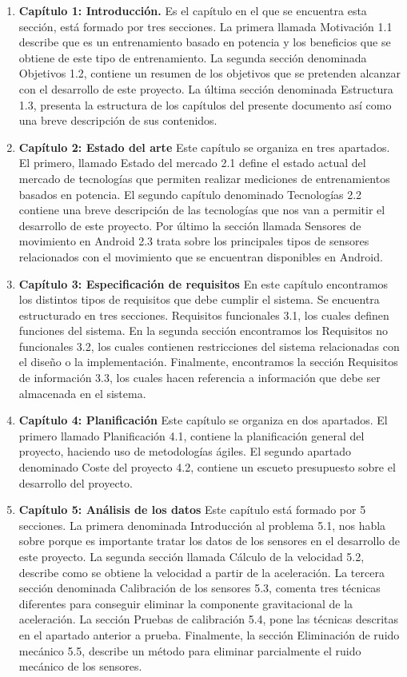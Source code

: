 \begin{enumerate}
	\item \textbf{Capítulo 1: Introducción.} Es el capítulo en el que se encuentra esta sección, está formado por tres secciones. La primera llamada Motivación 1.1 describe que es un entrenamiento basado en potencia y los beneficios que se obtiene de este tipo de entrenamiento. La segunda sección denominada Objetivos 1.2, contiene un resumen de los objetivos que se pretenden alcanzar con el desarrollo de este proyecto. La última sección denominada Estructura 1.3, presenta la estructura de los capítulos del presente documento así como una breve descripción de sus contenidos.
	\item \textbf{Capítulo 2: Estado del arte} Este capítulo se organiza en tres apartados. El primero, llamado Estado del mercado 2.1 define el estado actual del mercado de tecnologías que permiten realizar mediciones de entrenamientos basados en potencia. El segundo capítulo denominado Tecnologías 2.2 contiene una breve descripción de las tecnologías que nos van a permitir el desarrollo de este proyecto. Por último la sección llamada Sensores de movimiento en Android 2.3 trata sobre los principales tipos de sensores relacionados con el movimiento que se encuentran disponibles en Android.
	\item \textbf{Capítulo 3: Especificación de requisitos} En este capítulo encontramos los distintos tipos de requisitos que debe cumplir el sistema. Se encuentra estructurado en tres secciones. Requisitos funcionales 3.1, los cuales definen funciones del sistema. En la segunda sección encontramos los Requisitos no funcionales 3.2, los cuales contienen restricciones del sistema relacionadas con el diseño o la implementación. Finalmente, encontramos la sección Requisitos de información 3.3, los cuales hacen referencia a información que debe ser almacenada en el sistema.
	\item \textbf{Capítulo 4: Planificación} Este capítulo se organiza en dos apartados. El primero llamado Planificación 4.1, contiene la planificación general del proyecto, haciendo uso de metodologías ágiles. El segundo apartado denominado Coste del proyecto 4.2, contiene un escueto presupuesto sobre el desarrollo del proyecto.
	\item \textbf{Capítulo 5: Análisis de los datos} Este capítulo está formado por 5 secciones. La primera denominada Introducción al problema 5.1, nos habla sobre porque es importante tratar los datos de los sensores en el desarrollo de este proyecto. La segunda sección llamada Cálculo de la velocidad 5.2, describe como se obtiene la velocidad a partir de la aceleración. La tercera sección denominada Calibración de los sensores 5.3, comenta tres técnicas diferentes para conseguir eliminar la componente gravitacional de la aceleración. La sección Pruebas de calibración 5.4, pone las técnicas descritas en el apartado anterior a prueba. Finalmente, la sección Eliminación de ruido mecánico 5.5, describe un método para eliminar parcialmente el ruido mecánico de los sensores.

\end{enumerate}

